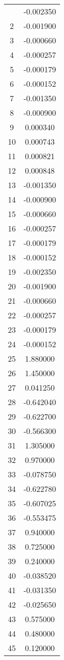 \documentclass[12pt]{article}
\begin{document}
\begin{longtable}{@{}cc@{}}
\bottomrule
\endlastfoot
1 & -0.002350 \\
2 & -0.001900 \\
3 & -0.000660 \\
4 & -0.000257 \\
5 & -0.000179 \\
6 & -0.000152 \\
7 & -0.001350 \\
8 & -0.000900 \\
9 & 0.000340 \\
10 & 0.000743 \\
11 & 0.000821 \\
12 & 0.000848 \\
13 & -0.001350 \\
14 & -0.000900 \\
15 & -0.000660 \\
16 & -0.000257 \\
17 & -0.000179 \\
18 & -0.000152 \\
19 & -0.002350 \\
20 & -0.001900 \\
21 & -0.000660 \\
22 & -0.000257 \\
23 & -0.000179 \\
24 & -0.000152 \\
25 & 1.880000 \\
26 & 1.450000 \\
27 & 0.041250 \\
28 & -0.642040 \\
29 & -0.622700 \\
30 & -0.566300 \\
31 & 1.305000 \\
32 & 0.970000 \\
33 & -0.078750 \\
34 & -0.622780 \\
35 & -0.607025 \\
36 & -0.553475 \\
37 & 0.940000 \\
38 & 0.725000 \\
39 & 0.240000 \\
40 & -0.038520 \\
41 & -0.031350 \\
42 & -0.025650 \\
43 & 0.575000 \\
44 & 0.480000 \\
45 & 0.120000 \\

\end{longtable}
\end{document}
